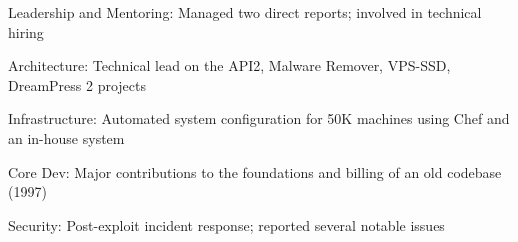 \item Leadership and Mentoring: Managed two direct reports; involved in technical hiring
\item Architecture: Technical lead on the API2, Malware Remover, VPS-SSD, DreamPress 2 projects
\item Infrastructure: Automated system configuration for 50K machines using Chef and an in-house system
\item Core Dev: Major contributions to the foundations and billing of an old codebase (1997)
\item Security: Post-exploit incident response; reported several notable issues
